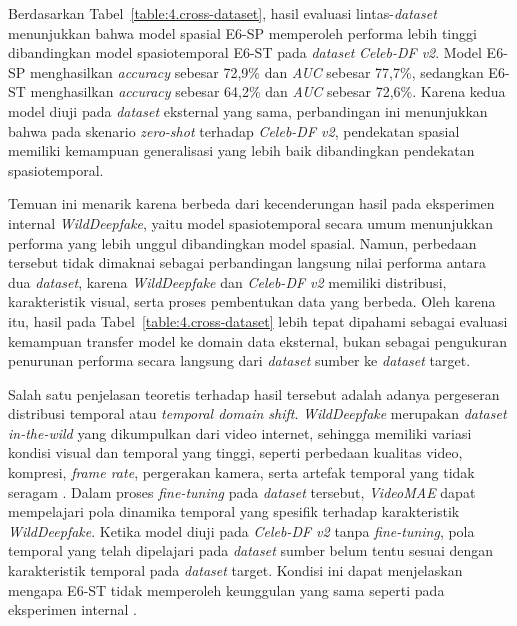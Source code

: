 Berdasarkan Tabel~\ref{table:4.cross-dataset}, hasil evaluasi lintas-\textit{dataset} menunjukkan bahwa model spasial E6-SP memperoleh performa lebih tinggi dibandingkan model spasiotemporal E6-ST pada \textit{dataset} \textit{Celeb-DF v2}. Model E6-SP menghasilkan \textit{accuracy} sebesar 72,9\% dan \textit{AUC} sebesar 77,7\%, sedangkan E6-ST menghasilkan \textit{accuracy} sebesar 64,2\% dan \textit{AUC} sebesar 72,6\%. Karena kedua model diuji pada \textit{dataset} eksternal yang sama, perbandingan ini menunjukkan bahwa pada skenario \textit{zero-shot} terhadap \textit{Celeb-DF v2}, pendekatan spasial memiliki kemampuan generalisasi yang lebih baik dibandingkan pendekatan spasiotemporal.

Temuan ini menarik karena berbeda dari kecenderungan hasil pada eksperimen internal \textit{WildDeepfake}, yaitu model spasiotemporal secara umum menunjukkan performa yang lebih unggul dibandingkan model spasial. Namun, perbedaan tersebut tidak dimaknai sebagai perbandingan langsung nilai performa antara dua \textit{dataset}, karena \textit{WildDeepfake} dan \textit{Celeb-DF v2} memiliki distribusi, karakteristik visual, serta proses pembentukan data yang berbeda. Oleh karena itu, hasil pada Tabel~\ref{table:4.cross-dataset} lebih tepat dipahami sebagai evaluasi kemampuan transfer model ke domain data eksternal, bukan sebagai pengukuran penurunan performa secara langsung dari \textit{dataset} sumber ke \textit{dataset} target.

Salah satu penjelasan teoretis terhadap hasil tersebut adalah adanya pergeseran distribusi temporal atau \textit{temporal domain shift}. \textit{WildDeepfake} merupakan \textit{dataset in-the-wild} yang dikumpulkan dari video internet, sehingga memiliki variasi kondisi visual dan temporal yang tinggi, seperti perbedaan kualitas video, kompresi, \textit{frame rate}, pergerakan kamera, serta artefak temporal yang tidak seragam \cite{Zi2024}. Dalam proses \textit{fine-tuning} pada \textit{dataset} tersebut, \textit{VideoMAE} dapat mempelajari pola dinamika temporal yang spesifik terhadap karakteristik \textit{WildDeepfake}. Ketika model diuji pada \textit{Celeb-DF v2} tanpa \textit{fine-tuning}, pola temporal yang telah dipelajari pada \textit{dataset} sumber belum tentu sesuai dengan karakteristik temporal pada \textit{dataset} target. Kondisi ini dapat menjelaskan mengapa E6-ST tidak memperoleh keunggulan yang sama seperti pada eksperimen internal \cite{tong2022videomaemaskedautoencodersdataefficient}.

